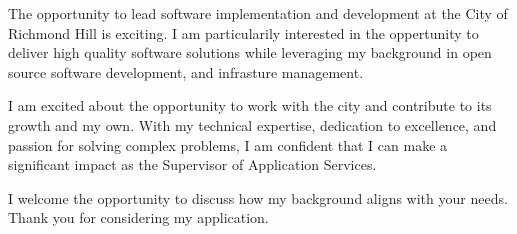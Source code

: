 \documentclass[11pt, letterpaper]{awesome-cv}
\begin{document}
\begin{cvletter}
The opportunity to lead software implementation and development at the City of Richmond Hill is exciting. I am particularily interested in the oppertunity to deliver high quality software solutions while leveraging my background in open source software development, and infrasture management.

I am excited about the opportunity to work with the city and contribute to its growth and my own. With my technical expertise, dedication to excellence, and passion for solving complex problems, I am confident that I can make a significant impact as the Supervisor of Application Services.

I welcome the opportunity to discuss how my background aligns with your needs. Thank you for considering my application.
\end{cvletter}


\makeletterclosing%
\end{document}
